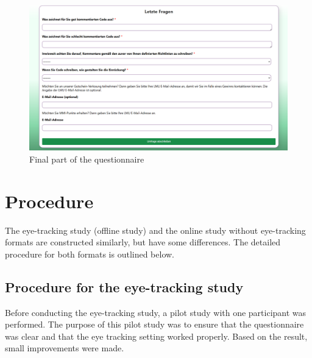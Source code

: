 \begin{figure}  [H]
  \centering
  \includegraphics[scale=0.45]{figures/last_part.png}
  \caption{Final part of the questionnaire}
  \label{fig:AnhangsChor}
\end{figure}


 
\section{Procedure}

The eye-tracking study (offline study) and the online study without eye-tracking formats are constructed similarly, but have some differences. The detailed procedure for both formats is outlined below.

\subsection{Procedure for the eye-tracking study}

Before conducting the eye-tracking study, a pilot study with one participant was performed. The purpose of this pilot study was to ensure that the questionnaire was clear and that the eye tracking setting worked properly. Based on the result, small improvements were made.



